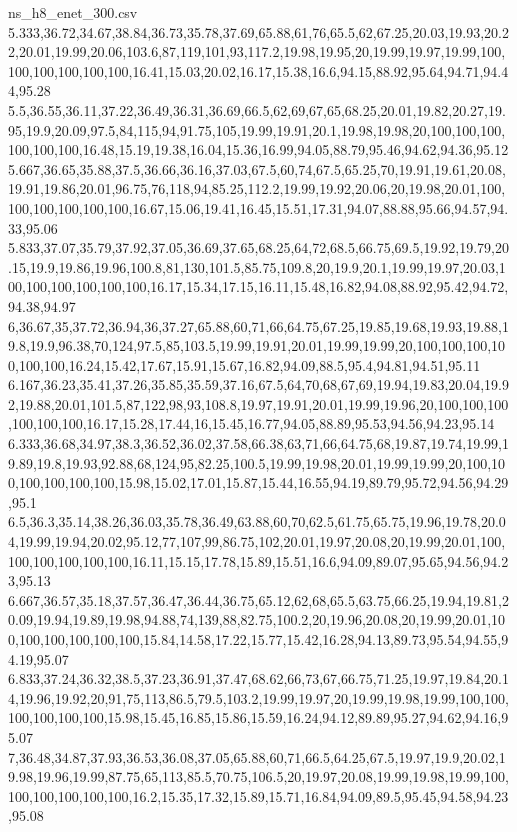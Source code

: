 \begin{filecontents*}[overwrite]{ns_h8_enet_300.csv}
5.333,36.72,34.67,38.84,36.73,35.78,37.69,65.88,61,76,65.5,62,67.25,20.03,19.93,20.22,20.01,19.99,20.06,103.6,87,119,101,93,117.2,19.98,19.95,20,19.99,19.97,19.99,100,100,100,100,100,100,16.41,15.03,20.02,16.17,15.38,16.6,94.15,88.92,95.64,94.71,94.44,95.28
5.5,36.55,36.11,37.22,36.49,36.31,36.69,66.5,62,69,67,65,68.25,20.01,19.82,20.27,19.95,19.9,20.09,97.5,84,115,94,91.75,105,19.99,19.91,20.1,19.98,19.98,20,100,100,100,100,100,100,16.48,15.19,19.38,16.04,15.36,16.99,94.05,88.79,95.46,94.62,94.36,95.12
5.667,36.65,35.88,37.5,36.66,36.16,37.03,67.5,60,74,67.5,65.25,70,19.91,19.61,20.08,19.91,19.86,20.01,96.75,76,118,94,85.25,112.2,19.99,19.92,20.06,20,19.98,20.01,100,100,100,100,100,100,16.67,15.06,19.41,16.45,15.51,17.31,94.07,88.88,95.66,94.57,94.33,95.06
5.833,37.07,35.79,37.92,37.05,36.69,37.65,68.25,64,72,68.5,66.75,69.5,19.92,19.79,20.15,19.9,19.86,19.96,100.8,81,130,101.5,85.75,109.8,20,19.9,20.1,19.99,19.97,20.03,100,100,100,100,100,100,16.17,15.34,17.15,16.11,15.48,16.82,94.08,88.92,95.42,94.72,94.38,94.97
6,36.67,35,37.72,36.94,36,37.27,65.88,60,71,66,64.75,67.25,19.85,19.68,19.93,19.88,19.8,19.9,96.38,70,124,97.5,85,103.5,19.99,19.91,20.01,19.99,19.99,20,100,100,100,100,100,100,16.24,15.42,17.67,15.91,15.67,16.82,94.09,88.5,95.4,94.81,94.51,95.11
6.167,36.23,35.41,37.26,35.85,35.59,37.16,67.5,64,70,68,67,69,19.94,19.83,20.04,19.92,19.88,20.01,101.5,87,122,98,93,108.8,19.97,19.91,20.01,19.99,19.96,20,100,100,100,100,100,100,16.17,15.28,17.44,16,15.45,16.77,94.05,88.89,95.53,94.56,94.23,95.14
6.333,36.68,34.97,38.3,36.52,36.02,37.58,66.38,63,71,66,64.75,68,19.87,19.74,19.99,19.89,19.8,19.93,92.88,68,124,95,82.25,100.5,19.99,19.98,20.01,19.99,19.99,20,100,100,100,100,100,100,15.98,15.02,17.01,15.87,15.44,16.55,94.19,89.79,95.72,94.56,94.29,95.1
6.5,36.3,35.14,38.26,36.03,35.78,36.49,63.88,60,70,62.5,61.75,65.75,19.96,19.78,20.04,19.99,19.94,20.02,95.12,77,107,99,86.75,102,20.01,19.97,20.08,20,19.99,20.01,100,100,100,100,100,100,16.11,15.15,17.78,15.89,15.51,16.6,94.09,89.07,95.65,94.56,94.23,95.13
6.667,36.57,35.18,37.57,36.47,36.44,36.75,65.12,62,68,65.5,63.75,66.25,19.94,19.81,20.09,19.94,19.89,19.98,94.88,74,139,88,82.75,100.2,20,19.96,20.08,20,19.99,20.01,100,100,100,100,100,100,15.84,14.58,17.22,15.77,15.42,16.28,94.13,89.73,95.54,94.55,94.19,95.07
6.833,37.24,36.32,38.5,37.23,36.91,37.47,68.62,66,73,67,66.75,71.25,19.97,19.84,20.14,19.96,19.92,20,91,75,113,86.5,79.5,103.2,19.99,19.97,20,19.99,19.98,19.99,100,100,100,100,100,100,15.98,15.45,16.85,15.86,15.59,16.24,94.12,89.89,95.27,94.62,94.16,95.07
7,36.48,34.87,37.93,36.53,36.08,37.05,65.88,60,71,66.5,64.25,67.5,19.97,19.9,20.02,19.98,19.96,19.99,87.75,65,113,85.5,70.75,106.5,20,19.97,20.08,19.99,19.98,19.99,100,100,100,100,100,100,16.2,15.35,17.32,15.89,15.71,16.84,94.09,89.5,95.45,94.58,94.23,95.08

\end{filecontents*}
